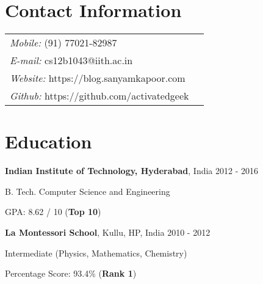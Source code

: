 \documentclass[margin,line]{res}
\newenvironment{list1}{
  \begin{list}{\ding{113}}{%
    \setlength{\itemsep}{0in}
    \setlength{\parsep}{0in} \setlength{\parskip}{0in}
    \setlength{\topsep}{0in} \setlength{\partopsep}{0in}
    \setlength{\leftmargin}{0.17in}}}{\end{list}}
\begin{document}

\begin{resume}

\section{\sc Contact Information}
  \vspace{.05in}
  \begin{tabular}{@{}p{2.9in}p{4in}}

	{\it Mobile:}  (91) 77021-82987 \\
	{\it E-mail:}  cs12b1043@iith.ac.in\\
	{\it Website:} https://blog.sanyamkapoor.com \\
	{\it Github:} https://github.com/activatedgeek \\

  \end{tabular}


\section{\sc Education}
  {\bf Indian Institute of Technology, Hyderabad}, India \hfill 2012 - 2016 \\
  \vspace*{-.1in}
  \begin{list1}
	\item[] B. Tech. Computer Science and Engineering
	\item[] GPA: 8.62 / 10 ({\bf Top 10})
  \end{list1}

  \vspace*{-2.5mm}

  {\bf La Montessori School}, Kullu, HP, India \hfill 2010 - 2012 \\
  \vspace*{-.1in}
  \begin{list1}
  	\item[] Intermediate (Physics, Mathematics, Chemistry)
	\item[] Percentage Score: 93.4\% ({\bf Rank 1})
  \end{list1}


\end{resume}
\end{document}
